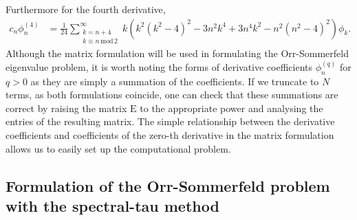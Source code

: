 \documentclass[a4paper, 12pt, twoside, openright]{article}
\numberwithin{equation}{section}
\begin{document}
Furthermore for the fourth derivative, 
\begin{align}
c_n\phi_n^{(4)} &= \frac{1}{24}\sum_{\substack{k=n+4 \\ k\equiv n\, \mathrm{mod}\, 2}}^{\infty} k\left(k^2(k^2-4)^2 - 3n^2k^4 + 3n^4k^2 - n^2(n^2-4)^2\right)\phi_k.
\end{align}
Although the matrix formulation will be used in formulating the Orr-Sommerfeld eigenvalue problem, it is worth noting the forms of derivative coefficients $\phi_n^{(q)}$ for $q>0$ as they are simply a summation of the coefficients. If we truncate to $N$ terms, as both formulations coincide, one can check that these summations are correct by raising the matrix $\mathrm{E}$ to the appropriate power and analysing the entries of the resulting matrix. The simple relationship between the derivative coefficients and coefficients of the zero-th derivative in the matrix formulation allows us to easily set up the computational problem.   
%
%
%
%
%
%
%


\subsection{Formulation of the Orr-Sommerfeld problem with the spectral-tau method}
\end{document}
